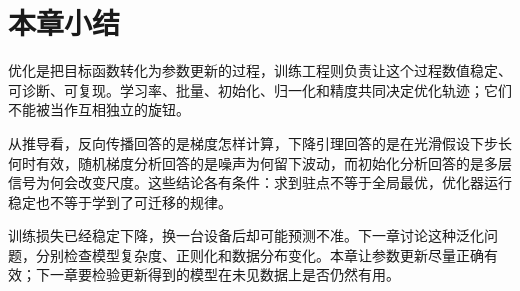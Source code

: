 \section{本章小结}
优化是把目标函数转化为参数更新的过程，训练工程则负责让这个过程数值稳定、可诊断、可复现。学习率、批量、初始化、归一化和精度共同决定优化轨迹；它们不能被当作互相独立的旋钮。

从推导看，反向传播回答的是梯度怎样计算，下降引理回答的是在光滑假设下步长何时有效，随机梯度分析回答的是噪声为何留下波动，而初始化分析回答的是多层信号为何会改变尺度。这些结论各有条件：求到驻点不等于全局最优，优化器运行稳定也不等于学到了可迁移的规律。

训练损失已经稳定下降，换一台设备后却可能预测不准。下一章讨论这种泛化问题，分别检查模型复杂度、正则化和数据分布变化。本章让参数更新尽量正确有效；下一章要检验更新得到的模型在未见数据上是否仍然有用。
